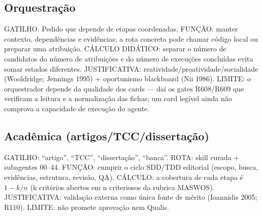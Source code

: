 \subsection{Orquestração}

\begin{descricao}
GATILHO. Pedido que depende de etapas coordenadas. FUNÇÃO: manter contexto,
dependências e evidências; a rota concreta pode chamar código local ou preparar
uma atribuição. CÁLCULO DIDÁTICO: separar o número de candidatos do número de
atribuições e do número de execuções concluídas evita somar estados diferentes.
JUSTIFICATIVA: reatividade/proatividade/socialidade (Wooldridge; Jennings
1995) + oportunismo blackboard (Nii 1986). LIMITE: o orquestrador depende da
qualidade dos cards — daí os gates R608/R609 que verificam a leitura e a
normalização das fichas; um card legível ainda não comprova a capacidade de
execução do agente.
\end{descricao}

\subsection{Acadêmica (artigos/TCC/dissertação)}

\begin{descricao}
GATILHO: ``artigo'', ``TCC'', ``dissertação'', ``banca''. ROTA: skill
curada + subagentes 00--44. FUNÇÃO: cumprir o ciclo SDD/TDD editorial
(escopo, busca, evidências, estrutura, revisão, QA). CÁLCULO: a cobertura de
cada etapa é $1 - k/n$ (k critérios abertos em n criteriosos da rubrica
MASWOS). JUSTIFICATIVA: validação externa como única fonte de mérito
(Ioannidis 2005; R110). LIMITE: não promete aprovação nem Qualis.
\end{descricao}


